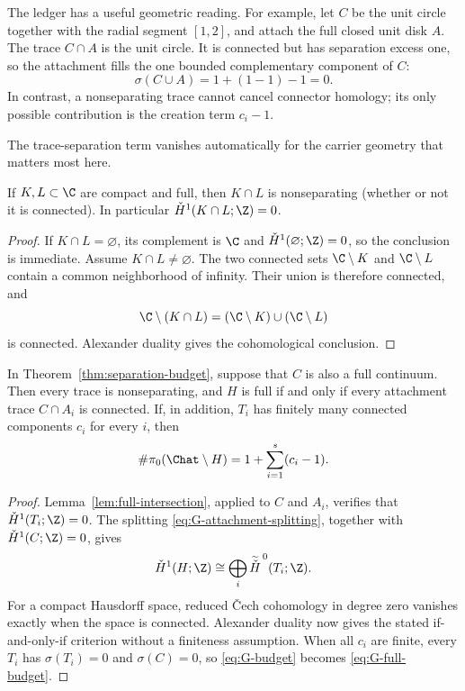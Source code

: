 The ledger has a useful geometric reading.  For example, let $C$ be the
unit circle together with the radial segment $[1,2]$, and attach the full
closed unit disk $A$.  The trace $C\cap A$ is the unit circle.  It is
connected but has separation excess one, so the attachment fills the one
bounded complementary component of $C$:
\[
 \sigma(C\cup A)=1+(1-1)-1=0.
\]
In contrast, a nonseparating trace cannot cancel connector homology; its
only possible contribution is the creation term $c_i-1$.

The trace-separation term vanishes automatically for the carrier geometry
that matters most here.

\begin{lemma}
\label{lem:full-intersection}
If $K,L\subset\C$ are compact and full, then $K\cap L$ is nonseparating
(whether or not it is connected).  In particular
$\check H^1(K\cap L;\Z)=0$.
\end{lemma}

\begin{proof}
If $K\cap L=\varnothing$, its complement is $\C$ and
$\check H^1(\varnothing;\Z)=0$, so the conclusion is immediate.  Assume
$K\cap L\ne\varnothing$.
The two connected sets $\C\setminus K$ and $\C\setminus L$ contain a common
neighborhood of infinity.  Their union is therefore connected, and
\[
 \C\setminus(K\cap L)
 =(\C\setminus K)\cup(\C\setminus L)
\]
is connected.  Alexander duality gives the cohomological conclusion.
\end{proof}

\begin{corollary}
\label{cor:full-connector-traces}
In Theorem~\ref{thm:separation-budget}, suppose that $C$ is also a full
continuum.  Then every trace is nonseparating, and $H$ is full if and only
if every attachment trace $C\cap A_i$ is connected.  If, in addition,
$T_i$ has finitely many connected components $c_i$ for every $i$, then
\begin{equation}
 \#\pi_0(\Chat\setminus H)
 =
 1+\sum_{i=1}^{s}(c_i-1).
 \label{eq:G-full-budget}
\end{equation}
\end{corollary}

\begin{proof}
Lemma~\ref{lem:full-intersection}, applied to $C$ and $A_i$, verifies
that $\check H^1(T_i;\Z)=0$.  The splitting
\eqref{eq:G-attachment-splitting}, together with
$\check H^1(C;\Z)=0$, gives
\[
 \check H^1(H;\Z)
 \cong
 \bigoplus_i\widetilde{\check H}^{\,0}(T_i;\Z).
\]
For a compact Hausdorff space, reduced \v{C}ech cohomology in degree zero
vanishes exactly when the space is connected.  Alexander duality now gives
the stated if-and-only-if criterion without a finiteness assumption.
When all $c_i$ are finite, every $T_i$ has $\sigma(T_i)=0$ and
$\sigma(C)=0$, so \eqref{eq:G-budget} becomes
\eqref{eq:G-full-budget}.
\end{proof}


